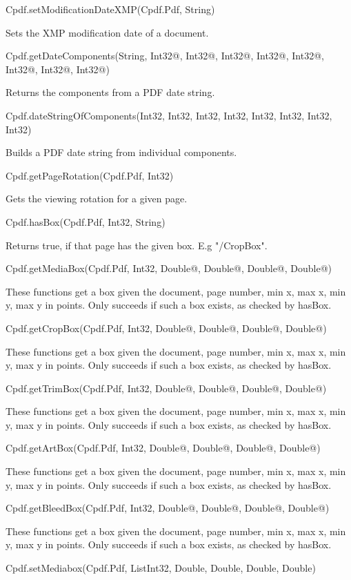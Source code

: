 Cpdf.setModificationDateXMP(Cpdf.Pdf, String)

Sets the XMP modification date of a document.

Cpdf.getDateComponents(String, Int32@, Int32@, Int32@, Int32@, Int32@, Int32@, Int32@, Int32@)

Returns the components from a PDF date string.

Cpdf.dateStringOfComponents(Int32, Int32, Int32, Int32, Int32, Int32, Int32, Int32)

Builds a PDF date string from individual
components.

Cpdf.getPageRotation(Cpdf.Pdf, Int32)

Gets the viewing rotation for a
given page.

Cpdf.hasBox(Cpdf.Pdf, Int32, String)

Returns true, if that page has the
given box. E.g "/CropBox".

Cpdf.getMediaBox(Cpdf.Pdf, Int32, Double@, Double@, Double@, Double@)

These functions get a box given the document, page number, min x, max x, 
min y, max y in points. Only succeeds if such a box exists, as checked by
hasBox.

Cpdf.getCropBox(Cpdf.Pdf, Int32, Double@, Double@, Double@, Double@)

These functions get a box given the document, page number, min x, max x, 
min y, max y in points. Only succeeds if such a box exists, as checked by
hasBox.

Cpdf.getTrimBox(Cpdf.Pdf, Int32, Double@, Double@, Double@, Double@)

These functions get a box given the document, page number, min x, max x, 
min y, max y in points. Only succeeds if such a box exists, as checked by
hasBox.

Cpdf.getArtBox(Cpdf.Pdf, Int32, Double@, Double@, Double@, Double@)

These functions get a box given the document, page number, min x, max x, 
min y, max y in points. Only succeeds if such a box exists, as checked by
hasBox.

Cpdf.getBleedBox(Cpdf.Pdf, Int32, Double@, Double@, Double@, Double@)

These functions get a box given the document, page number, min x, max x, 
min y, max y in points. Only succeeds if such a box exists, as checked by
hasBox.

Cpdf.setMediabox(Cpdf.Pdf, List{Int32}, Double, Double, Double, Double)

